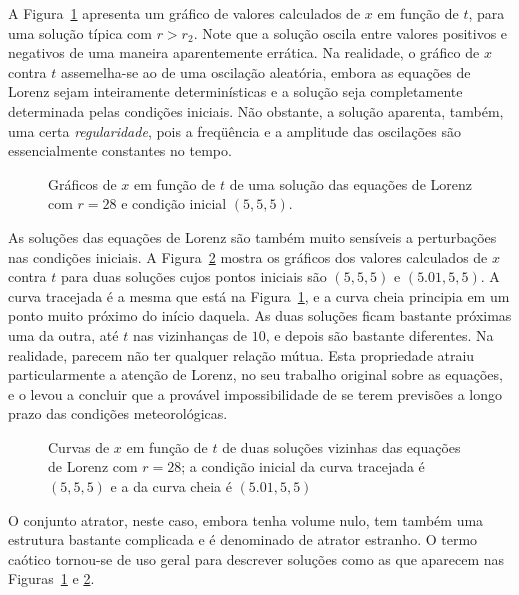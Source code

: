 A Figura~\ref{figlorenzx} apresenta um gráfico de valores calculados de $x$ em função de $t$, para uma solução típica com $r>r_{2}$. Note que a solução oscila entre valores positivos e negativos de uma maneira aparentemente errática. Na realidade, o gráfico de $x$ contra $t$ assemelha-se ao de uma oscilação aleatória, embora as equações de Lorenz sejam inteiramente determinísticas e a solução seja completamente determinada pelas condições iniciais. Não obstante, a solução aparenta, também, uma certa \textit{regularidade}, pois a freqüência e a amplitude das oscilações são essencialmente constantes no tempo.

\begin{figure}[ht]
\centering {} 
\caption{Gráficos de $x$ em função de $t$ de uma solução das equações de Lorenz com $r=28$ e condição inicial $(5,5,5)$.}
\label{figlorenzx}
\end{figure}

As soluções das equações de Lorenz são também muito sensíveis a perturbações nas condições iniciais. A Figura~\ref{figlorenzxci} mostra os gráficos dos valores calculados de $x$ contra $t$ para duas soluções cujos pontos iniciais são $(5,5,5)$ e $(5.01,5,5)$. A curva tracejada é a mesma que está na Figura~\ref{figlorenzx}, e a curva cheia principia em um ponto muito próximo do início daquela. As duas soluções ficam bastante próximas uma da outra, até $t$ nas vizinhanças de $10$, e depois são bastante diferentes. Na realidade, parecem não ter qualquer relação mútua. Esta propriedade atraiu particularmente a atenção de Lorenz, no seu trabalho original sobre as equações, e o levou a concluir que a provável impossibilidade de se terem previsões a longo prazo das condições meteorológicas.

\begin{figure}[ht]
\centering {} 
\caption{Curvas de $x$ em função de $t$ de duas soluções vizinhas das equações de Lorenz com $r=28$; a condição inicial da curva tracejada é $(5,5,5)$ e a da curva cheia é $(5.01,5,5)$}
\label{figlorenzxci}
\end{figure}

O conjunto atrator, neste caso, embora tenha volume nulo, tem também uma estrutura bastante complicada e é denominado de atrator estranho. O termo caótico tornou-se de uso geral para descrever soluções como as que aparecem nas Figuras~\ref{figlorenzx} e \ref{figlorenzxci}.

